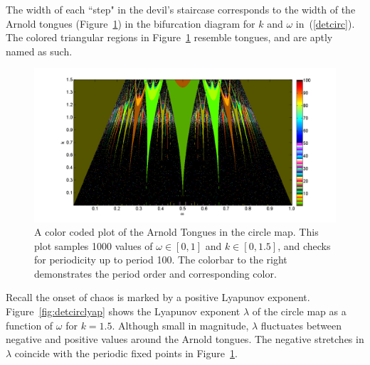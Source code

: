 The width of each ``step" in the devil's staircase corresponds to the width of the Arnold
tongues (Figure~\ref{fig:dettongues}) in the bifurcation diagram for
$k$ and $\omega$ in~(\ref{detcirc}). The colored
triangular regions in Figure~\ref{fig:dettongues} resemble tongues,
and are aptly named as such.
\begin{figure}[!h]
\caption[The Arnold Tongues for the deterministic circle map]{A color coded
  plot of the Arnold Tongues in the circle map. This plot samples 1000 values of $\omega
  \in [0,1]$ and $k \in
  [0,1.5]$, and checks for periodicity up to period 100. The colorbar
  to the right demonstrates the period order and corresponding
  color.}\label{fig:dettongues}
	\begin{center}
		\includegraphics[scale=0.45]{figs/tongues_1000_det.png}
	\end{center}
\end{figure}
Recall the onset of chaos is marked by a positive Lyapunov
exponent. Figure~\ref{fig:detcirclyap} shows the Lyapunov exponent
$\lambda$ of
the circle map as a function of $\omega$ for $k=1.5$. Although small in
magnitude, $\lambda$ fluctuates between negative and positive
values around the Arnold tongues. The negative stretches in $\lambda$
coincide with the periodic fixed points in Figure~\ref{fig:dettongues}.  
